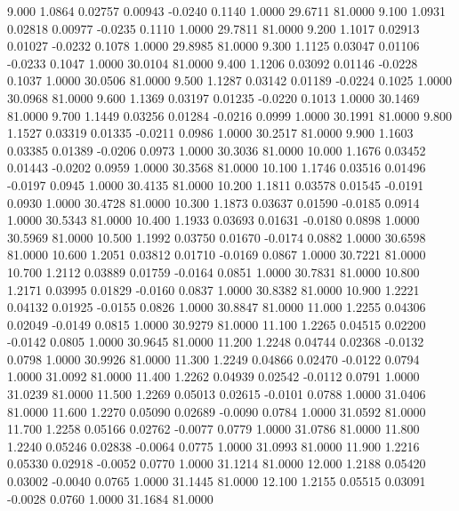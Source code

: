    9.000   1.0864   0.02757   0.00943  -0.0240   0.1140   1.0000  29.6711  81.0000
   9.100   1.0931   0.02818   0.00977  -0.0235   0.1110   1.0000  29.7811  81.0000
   9.200   1.1017   0.02913   0.01027  -0.0232   0.1078   1.0000  29.8985  81.0000
   9.300   1.1125   0.03047   0.01106  -0.0233   0.1047   1.0000  30.0104  81.0000
   9.400   1.1206   0.03092   0.01146  -0.0228   0.1037   1.0000  30.0506  81.0000
   9.500   1.1287   0.03142   0.01189  -0.0224   0.1025   1.0000  30.0968  81.0000
   9.600   1.1369   0.03197   0.01235  -0.0220   0.1013   1.0000  30.1469  81.0000
   9.700   1.1449   0.03256   0.01284  -0.0216   0.0999   1.0000  30.1991  81.0000
   9.800   1.1527   0.03319   0.01335  -0.0211   0.0986   1.0000  30.2517  81.0000
   9.900   1.1603   0.03385   0.01389  -0.0206   0.0973   1.0000  30.3036  81.0000
  10.000   1.1676   0.03452   0.01443  -0.0202   0.0959   1.0000  30.3568  81.0000
  10.100   1.1746   0.03516   0.01496  -0.0197   0.0945   1.0000  30.4135  81.0000
  10.200   1.1811   0.03578   0.01545  -0.0191   0.0930   1.0000  30.4728  81.0000
  10.300   1.1873   0.03637   0.01590  -0.0185   0.0914   1.0000  30.5343  81.0000
  10.400   1.1933   0.03693   0.01631  -0.0180   0.0898   1.0000  30.5969  81.0000
  10.500   1.1992   0.03750   0.01670  -0.0174   0.0882   1.0000  30.6598  81.0000
  10.600   1.2051   0.03812   0.01710  -0.0169   0.0867   1.0000  30.7221  81.0000
  10.700   1.2112   0.03889   0.01759  -0.0164   0.0851   1.0000  30.7831  81.0000
  10.800   1.2171   0.03995   0.01829  -0.0160   0.0837   1.0000  30.8382  81.0000
  10.900   1.2221   0.04132   0.01925  -0.0155   0.0826   1.0000  30.8847  81.0000
  11.000   1.2255   0.04306   0.02049  -0.0149   0.0815   1.0000  30.9279  81.0000
  11.100   1.2265   0.04515   0.02200  -0.0142   0.0805   1.0000  30.9645  81.0000
  11.200   1.2248   0.04744   0.02368  -0.0132   0.0798   1.0000  30.9926  81.0000
  11.300   1.2249   0.04866   0.02470  -0.0122   0.0794   1.0000  31.0092  81.0000
  11.400   1.2262   0.04939   0.02542  -0.0112   0.0791   1.0000  31.0239  81.0000
  11.500   1.2269   0.05013   0.02615  -0.0101   0.0788   1.0000  31.0406  81.0000
  11.600   1.2270   0.05090   0.02689  -0.0090   0.0784   1.0000  31.0592  81.0000
  11.700   1.2258   0.05166   0.02762  -0.0077   0.0779   1.0000  31.0786  81.0000
  11.800   1.2240   0.05246   0.02838  -0.0064   0.0775   1.0000  31.0993  81.0000
  11.900   1.2216   0.05330   0.02918  -0.0052   0.0770   1.0000  31.1214  81.0000
  12.000   1.2188   0.05420   0.03002  -0.0040   0.0765   1.0000  31.1445  81.0000
  12.100   1.2155   0.05515   0.03091  -0.0028   0.0760   1.0000  31.1684  81.0000
